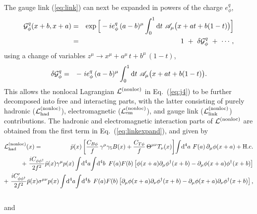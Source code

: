 \documentclass[preprintnumbers,prd,superscriptaddress,preprint]{revtex4-1}
\begin{document}
The gauge link (\ref{eq:link}) can next be expanded in powers of the charge $e_\phi^q$,
%
\begin{eqnarray}
{\cal G}^q_\phi(x+b,x+a)
&=& \exp \Big[ -i e^q_\phi\, (a-b)^\mu
	      \int_0^1 \dd{t}\, \mathscr{A}_\mu\big(x+at+b(1-t)\big)
	 \Big]
\notag\\
&=& 1\ +\ \delta {\cal G}^q_\phi\
       +\ \cdots,
\label{eq:linkexpand}
\end{eqnarray}
%
using a change of variables	$z^\mu \to x^\mu + a^\mu\, t + b^\mu\, (1-t)$, %
%
\begin{eqnarray}
\delta {\cal G}^q_\phi
&=& -\ i e^q_\phi\, (a-b)^\mu
       \int_0^1 \dd{t}\, \mathscr{A}_\mu\big(x+at+b(1-t)\big).
\label{eq:deltaG}
\end{eqnarray}
%
This allows the nonlocal Lagrangian ${\cal L}^{\rm (nonloc)}$ in Eq.~(\ref{eq:j4}) to be further decomposed into free and interacting parts, with the latter consisting of
purely hadronic (${\cal L}^{\rm (nonloc)}_{\rm had}$), electromagnetic (${\cal L}^{\rm (nonloc)}_{\rm em}$), and gauge link (${\cal L}^{\rm (nonloc)}_{\rm link}$) contributions.
%
The hadronic and electromagnetic interaction parts of ${\cal L}^{\rm (nonloc)}$ are obtained from the first term in Eq.~(\ref{eq:linkexpand}), and given by
%
\begin{eqnarray}
{\cal L}^{\rm (nonloc)}_{\rm had}(x)
&=& \bar{p}(x)
    \left[ \frac{C_{B\phi}}{f}\, \gamma^\mu \gamma_5 B(x)
	 + \frac{C_{T\phi}}{f}\, \Theta^{\mu\nu} T_\nu(x)
    \right]
    \!\int\!\dd[4]{a}\, F(a)\, \partial_\mu \phi(x+a)
	+ {\rm H.c.}
\notag\\
& & \hspace*{-2.5cm}
 +\ \frac{iC_{\phi\phi^\dag}}{2f^2}
    \bar{p}(x) \gamma^\mu p(x)
    \int\!\dd[4]{a}\!\int\!\dd[4]{b}\ F(a) F(b)
    \left[ \phi(x+a) \partial_\mu \phi^\dag(x+b)
	 - \partial_\mu \phi(x+a) \phi^\dag(x+b)
    \right]
\notag \\
& & \hspace*{-2.5cm}
 +\ \frac{iC_{\phi\phi^\dag}'}{2f^2}
    \bar{p}(x) \sigma^{\mu\nu} p(x)
    \int\!\dd[4]{a}\!\int\!\dd[4]{b}\ F(a) F(b)
    \left[ \partial_\mu\phi(x+a) \partial_\nu \phi^\dag(x+b)
	 - \partial_\mu \phi(x+a) \partial_\nu \phi^\dag(x+b)
    \right],
\notag\\
& &
\label{eq:Lnonloc_had}
\end{eqnarray}
%
and
%
\end{document}

